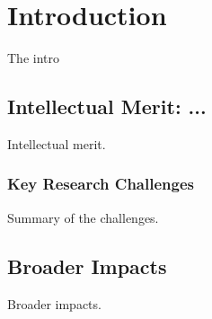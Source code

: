 
\section{Introduction}

The intro

\subsection{Intellectual Merit: ...}

Intellectual merit.


\subsubsection*{Key Research Challenges}

Summary of the challenges.


\subsection{Broader Impacts}

Broader impacts.
